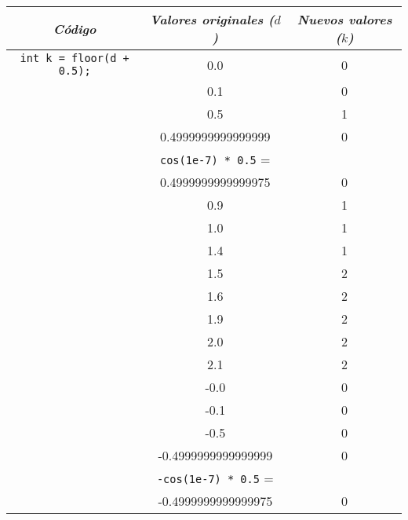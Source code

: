 \documentclass[10pt,letterpaper,twocolumn,twosided]{article}
\begin{document}
\begin{center}
  \renewcommand{\arraystretch}{1.3} %
  \begin{tabular}{| c | c | c | }
    \hline
    \textit{Código} & \textit{Valores originales ($d$)} & \textit{Nuevos valores ($k$)} \\
    \hline\hline

    \verb_int k = floor(d + 0.5);_       & 0.0  & 0 \\ \cline{2-3}
                                         & 0.1  & 0 \\ \cline{2-3}
                                         & 0.5  & 1 \\ \cline{2-3}
                                         & 0.4999999999999999 & 0 \\ \cline{2-3}
                                         & \verb_cos(1e-7) * 0.5_ =  & \\ & 0.4999999999999975 & 0 \\ \cline{2-3}
                                         & 0.9  & 1 \\ \cline{2-3}
                                         & 1.0 & 1 \\ \cline{2-3}
                                         & 1.4 & 1 \\ \cline{2-3}
                                         & 1.5 & 2 \\ \cline{2-3}
                                         & 1.6 & 2 \\ \cline{2-3}
                                         & 1.9 & 2 \\ \cline{2-3}
                                         & 2.0 & 2 \\ \cline{2-3}
                                         & 2.1 & 2 \\ \cline{2-3}
                                         & -0.0  & 0 \\ \cline{2-3}
                                         & -0.1  & 0 \\ \cline{2-3}
                                         & -0.5  & 0 \\ \cline{2-3}
                                         & -0.4999999999999999 & 0 \\ \cline{2-3}
                                         & \verb_-cos(1e-7) * 0.5_ =  & \\ & -0.4999999999999975 & 0 \\ \cline{2-3}

\end{tabular}
\end{center}
\end{document}
